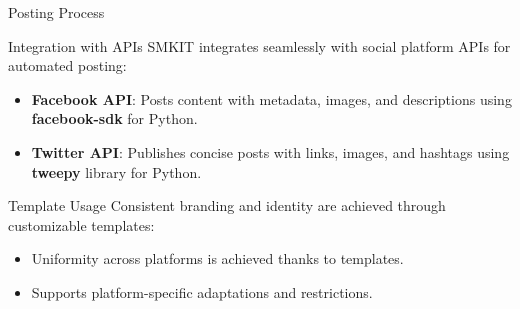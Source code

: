 \documentclass{beamer}
\begin{document}

    \begin{frame}{Posting Process}
        \begin{block}{Integration with APIs}
            SMKIT integrates seamlessly with social platform APIs for automated posting:
            \begin{itemize}
                \item \textbf{Facebook API}: Posts content with metadata, images, and descriptions using \textbf{facebook-sdk} for Python.
                \item \textbf{Twitter API}: Publishes concise posts with links, images, and hashtags using \textbf{tweepy} library  for Python.
            \end{itemize}
        \end{block}
    
        \begin{block}{Template Usage}
            Consistent branding and identity are achieved through customizable templates:
            \begin{itemize}
                \item Uniformity across platforms is achieved thanks to templates.
                \item Supports platform-specific adaptations and restrictions.
            \end{itemize}
        \end{block}
    \end{frame}
\end{document}
